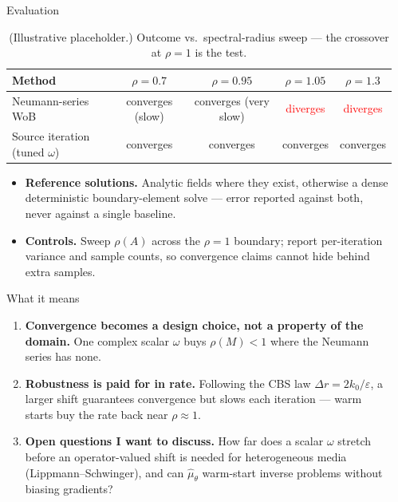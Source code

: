 \documentclass[final]{beamer}
\newlength{\sepwidth}
\newlength{\colwidthright}
\newcommand{\separatorcolumn}{\begin{column}{\sepwidth}\end{column}}
\begin{document}
\begin{frame}[t]
\begin{columns}[t]
\begin{column}{\colwidthright}
\begin{block}{Evaluation}
				\begin{table}
					\centering
					\begin{tabular}{lcccc}
						\toprule
						\textbf{Method} & $\rho = 0.7$ & $\rho = 0.95$ & $\rho = 1.05$ & $\rho = 1.3$ \\
						\midrule
						Neumann-series WoB & converges (slow) & converges (very slow) & \textcolor{red}{diverges} & \textcolor{red}{diverges} \\
						Source iteration (tuned $\omega$) & converges & converges & converges & converges \\
						\bottomrule
					\end{tabular}
					\caption{(Illustrative placeholder.) Outcome vs.\ spectral-radius sweep --- the crossover at $\rho = 1$ is the test.}
				\end{table}

				\begin{itemize}
					\item \textbf{Reference solutions.} Analytic fields where they exist, otherwise a dense deterministic boundary-element solve --- error reported against both, never against a single baseline.
					\item \textbf{Controls.} Sweep $\rho(A)$ across the $\rho = 1$ boundary; report per-iteration variance and sample counts, so convergence claims cannot hide behind extra samples.
				\end{itemize}

			\end{block}

			\begin{block}{What it means}

				\begin{enumerate}
					\item \textbf{Convergence becomes a design choice, not a property of the domain.} One complex scalar $\omega$ buys $\rho(M) < 1$ where the Neumann series has none.
					\item \textbf{Robustness is paid for in rate.} Following the CBS law $\Delta r = 2k_0/\varepsilon$, a larger shift guarantees convergence but slows each iteration --- warm starts buy the rate back near $\rho \approx 1$.
					\item \textbf{Open questions I want to discuss.} How far does a scalar $\omega$ stretch before an operator-valued shift is needed for heterogeneous media (Lippmann--Schwinger), and can $\hat\mu_\theta$ warm-start inverse problems without biasing gradients?
				\end{enumerate}

			\end{block}

		\end{column}

		\separatorcolumn
	\end{columns}
\end{frame}
\end{document}

